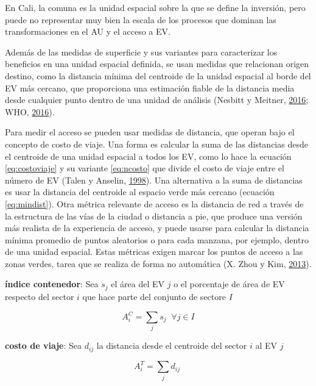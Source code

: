 \documentclass[12pt,a4paper,openany]{book}
\theoremstyle{definition}
\theoremstyle{definition}
\theoremstyle{definition}
\theoremstyle{remark}
\begin{document}
En Cali, la comuna es la unidad espacial sobre la que se define la
inversión, pero puede no representar muy bien la escala de los procesos
que dominan las transformaciones en el AU y el acceso a EV.

Además de las medidas de superficie y sus variantes para caracterizar
los beneficios en una unidad espacial definida, se usan medidas que
relacionan origen destino, como la distancia mínima del centroide de la
unidad espacial al borde del EV más cercano, que proporciona una
estimación fiable de la distancia media desde cualquier punto dentro de
una unidad de análisis (Nesbitt y Meitner,
\protect\hyperlink{ref-nesbitt_exploring_2016}{2016}; WHO,
\protect\hyperlink{ref-who2016urban}{2016}).

Para medir el acceso se pueden usar medidas de distancia, que operan
bajo el concepto de costo de viaje. Una forma es calcular la suma de las
distancias desde el centroide de una unidad espacial a todos los EV,
como lo hace la ecuación \eqref{eq:costoviaje} y su variante
\eqref{eq:ncosto} que divide el costo de viaje entre el número de EV
(Talen y Anselin, \protect\hyperlink{ref-talen_assessing_1998}{1998}).
Una alternativa a la suma de distancias es usar la distancia del
centroide al espacio verde más cercano (ecuación \eqref{eq:mindist}). Otra
métrica relevante de acceso es la distancia de red a través de la
estructura de las vías de la ciudad o distancia a pie, que produce una
versión más realista de la experiencia de acceso, y puede usarse para
calcular la distancia mínima promedio de puntos aleatorios o para cada
manzana, por ejemplo, dentro de una unidad espacial. Estas métricas
exigen marcar los puntos de acceso a las zonas verdes, tarea que se
realiza de forma no automática (X. Zhou y Kim,
\protect\hyperlink{ref-zhou_social_2013}{2013}).

\textbf{índice contenedor}: Sea \(s_j\) el área del EV \(j\) o el
porcentaje de área de EV respecto del sector \(i\) que hace parte del
conjunto de sectore \(I\)

\begin{equation}
A^{C}_i =\sum_j{s_j} \;  \; \forall  j \in I
\label{eq:contenedor}
\end{equation}

\textbf{costo de viaje}: Sea \(d_{ij}\) la distancia desde el centroide
del sector \(i\) al EV \(j\)

\begin{equation}
A^{T}_i =\sum_j{d_{ij}} \; 
\label{eq:costoviaje}
\end{equation}
\end{document}
